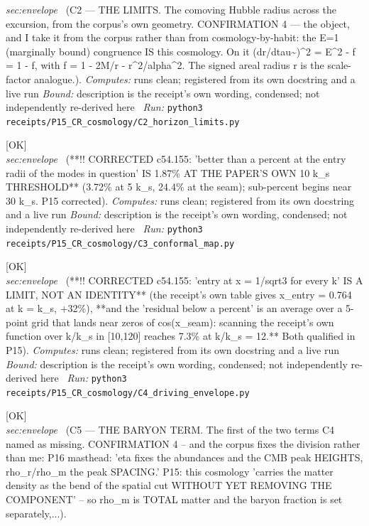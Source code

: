 \begin{description}
\textit{sec:envelope} \ (C2 --- THE LIMITS. The comoving Hubble radius across the excursion, from the corpus's own geometry. CONFIRMATION 4 --- the object, and I take it from the corpus rather than from cosmology-by-habit: the E=1 (marginally bound) congruence IS this cosmology. On it (dr/dtau\textasciitilde{})\textasciicircum{}2 = E\textasciicircum{}2 - f = 1 - f, with f = 1 - 2M/r - r\textasciicircum{}2/alpha\textasciicircum{}2. The signed areal radius r is the scale-factor analogue.). 
\emph{Computes:} runs clean; registered from its own docstring and a live run
 \emph{Bound:} description is the receipt's own wording, condensed; not independently re-derived here
\ \emph{Run:} \texttt{python3 receipts/P15\_CR\_cosmology/C2\_horizon\_limits.py}
\item[\rcptlabel{C3_conformal_map}{P15R49}\textbf{P15R49}\quad\texttt{C3\_conformal\_map}]\hfill\textsf{[OK]}\\
\textit{sec:envelope} \ (**!! CORRECTED c54.155: 'better than a percent at the entry radii of the modes in question' IS 1.87\% AT THE PAPER'S OWN 10 k\_s THRESHOLD** (3.72\% at 5 k\_s, 24.4\% at the seam); sub-percent begins near 30 k\_s. P15 corrected). 
\emph{Computes:} runs clean; registered from its own docstring and a live run
 \emph{Bound:} description is the receipt's own wording, condensed; not independently re-derived here
\ \emph{Run:} \texttt{python3 receipts/P15\_CR\_cosmology/C3\_conformal\_map.py}
\item[\rcptlabel{C4_driving_envelope}{P15R50}\textbf{P15R50}\quad\texttt{C4\_driving\_envelope}]\hfill\textsf{[OK]}\\
\textit{sec:envelope} \ (**!! CORRECTED c54.155: 'entry at x = 1/sqrt3 for every k' IS A LIMIT, NOT AN IDENTITY** (the receipt's own table gives x\_entry = 0.764 at k = k\_s, +32\%), **and the 'residual below a percent' is an average over a 5-point grid that lands near zeros of cos(x\_seam): scanning the receipt's own function over k/k\_s in [10,120] reaches 7.3\% at k/k\_s = 12.** Both qualified in P15). 
\emph{Computes:} runs clean; registered from its own docstring and a live run
 \emph{Bound:} description is the receipt's own wording, condensed; not independently re-derived here
\ \emph{Run:} \texttt{python3 receipts/P15\_CR\_cosmology/C4\_driving\_envelope.py}
\item[\rcptlabel{C5b_baryon_term}{P15R51}\textbf{P15R51}\quad\texttt{C5b\_baryon\_term}]\hfill\textsf{[OK]}\\
\textit{sec:envelope} \ (C5 --- THE BARYON TERM. The first of the two terms C4 named as missing. CONFIRMATION 4 -- and the corpus fixes the division rather than me: P16 masthead: 'eta fixes the abundances and the CMB peak HEIGHTS, rho\_r/rho\_m the peak SPACING.' P15: this cosmology 'carries the matter density as the bend of the spatial cut WITHOUT YET REMOVING THE COMPONENT' -- so rho\_m is TOTAL matter and the baryon fraction is set separately,...). 

\end{description}
